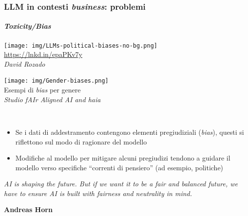 %
\begin{frame}[t] \frametitle{LLM in contesti \emph{business}: problemi}
\framesubtitle{\emph{Toxicity/Bias}}
{\scriptsize
{}
    \begin{minipage}[t]{\textwidth}
        \begin{minipage}[t]{.49\textwidth}
            \centering
            \texttt{[image: img/LLMs-political-biases-no-bg.png]}
            {\tiny\\\url{https://lnkd.in/epaPKv7y}\\\vspace*{-1pt}\textit{\textcopyright David Rozado}}
        \end{minipage}
        \begin{minipage}[t]{.49\textwidth}
            \centering
            \texttt{[image: img/Gender-biases.png]}
            {\tiny\\Esempi di \textit{bias} per genere\\\vspace*{-1pt}\textit{\textcopyright Studio fAIr Aligned AI and haia}}
        \end{minipage}
    \end{minipage}
    \\\vspace*{.3cm}
    \begin{minipage}[t]{\textwidth}
        \begin{itemize}[leftmargin=10pt,align=right]
            \item[\alert{\faArrowCircleRight}] Se i dati di addestramento contengono elementi pregiudiziali (\emph{bias}), questi si riflettono sul modo di ragionare del modello
            \item[\alert{\faArrowCircleRight}] Modifiche al modello per mitigare alcuni pregiudizi tendono a guidare il modello verso specifiche ``correnti di pensiero'' (ad esempio, politiche)
        \end{itemize}
        \begin{minipage}[t]{\textwidth}
            \renewcommand{\epigraphsize}{\tiny}
            \setlength{\afterepigraphskip}{0pt}
            \setlength{\beforeepigraphskip}{5pt}
            \setlength{\epigraphwidth}{0.5\textwidth}
            \centering
            \epigraph{\textit{AI is shaping the future. But if we want it to be a fair and balanced future, we have to ensure AI is built with fairness and neutrality in mind.}}{\textbf{Andreas Horn}}
        \end{minipage}%
    \end{minipage}
}
\end{frame}
